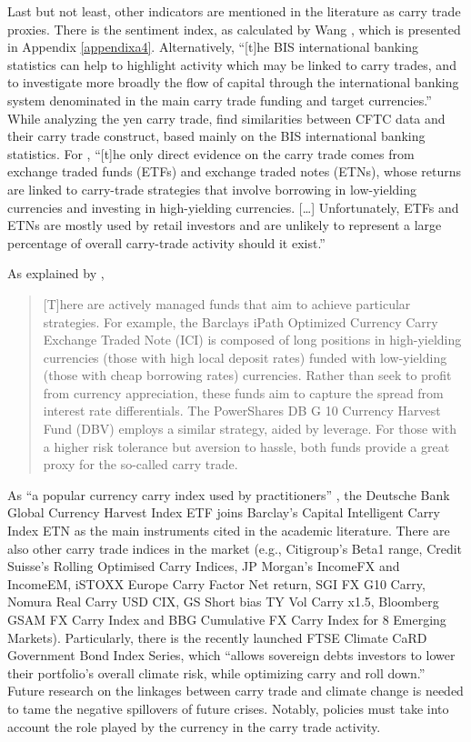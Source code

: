 \documentclass[a4paper, twoside]{templates/ociamthesis}
\begin{document}
Last but not least, other indicators are mentioned in the literature as carry trade proxies. There is the sentiment index, as calculated by Wang \autocite*{wang2001,wang2004}, which is presented in Appendix \ref{appendixa4}. Alternatively, ``{[}t{]}he BIS international banking statistics can help to highlight activity which may be linked to carry trades, and to investigate more broadly the flow of capital through the international banking system denominated in the main carry trade funding and target currencies.'' \autocite[ 32]{galati2007} While analyzing the yen carry trade, \textcite{cecchetti2010} find similarities between CFTC data and their carry trade construct, based mainly on the BIS international banking statistics. For \textcite[ 438]{curcuru2011}, ``{[}t{]}he only direct evidence on the carry trade comes from exchange traded funds (ETFs) and exchange traded notes (ETNs), whose returns are linked to carry-trade strategies that involve borrowing in low-yielding currencies and investing in high-yielding currencies. {[}\ldots{]} Unfortunately, ETFs and ETNs are mostly used by retail investors and are unlikely to represent a large percentage of overall carry-trade activity should it exist.''

As explained by \textcite[ 46]{kritzer2012},

\begin{quote}
{[}T{]}here are actively managed funds that aim to achieve particular strategies. For example, the Barclays iPath Optimized Currency Carry Exchange Traded Note (ICI) is composed of long positions in high-yielding currencies (those with high local deposit rates) funded with low-yielding (those with cheap borrowing rates) currencies. Rather than seek to profit from currency appreciation, these funds aim to capture the spread from interest rate differentials. The PowerShares DB G 10 Currency Harvest Fund (DBV) employs a similar strategy, aided by leverage. For those with a higher risk tolerance but aversion to hassle, both funds provide a great proxy for the so-called carry trade.
\end{quote}

As ``a popular currency carry index used by practitioners'' \autocite[ 376]{doskov2015}, the Deutsche Bank Global Currency Harvest Index ETF joins Barclay's Capital Intelligent Carry Index ETN as the main instruments cited in the academic literature. There are also other carry trade indices in the market (e.g., Citigroup's Beta1 range, Credit Suisse's Rolling Optimised Carry Indices, JP Morgan's IncomeFX and IncomeEM, iSTOXX Europe Carry Factor Net return, SGI FX G10 Carry, Nomura Real Carry USD CIX, GS Short bias TY Vol Carry x1.5, Bloomberg GSAM FX Carry Index and BBG Cumulative FX Carry Index for 8 Emerging Markets). Particularly, there is the recently launched FTSE Climate CaRD Government Bond Index Series, which ``allows sovereign debts investors to lower their portfolio's overall climate risk, while optimizing carry and roll down.'' \autocite{ftserussell2021} Future research on the linkages between carry trade and climate change is needed to tame the negative spillovers of future crises. Notably, policies must take into account the role played by the currency in the carry trade activity.
\end{document}
